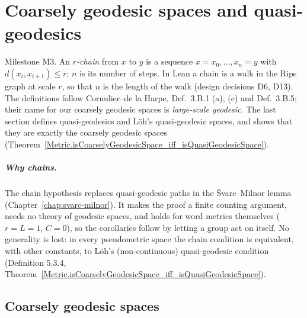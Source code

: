 \chapter{Coarsely geodesic spaces and quasi-geodesics}
\label{chap:coarsely-geodesic}

Milestone M3. An \emph{$r$-chain} from $x$ to $y$ is a sequence $x = x_0, \dots, x_n = y$ with
$d(x_i, x_{i+1}) \le r$; $n$ is its number of steps. In Lean a chain is a walk in the Rips graph at
scale $r$, so that $n$ is the length of the walk (design decisions D6, D13). The definitions follow
Cornulier--de la Harpe, Def.~3.B.1 (a), (c) and Def.~3.B.5; their name for our coarsely geodesic
spaces is \emph{large-scale geodesic}. The last section defines quasi-geodesics and L\"oh's quasi-geodesic
spaces, and shows that they are exactly the coarsely geodesic spaces
(Theorem~\ref{Metric.isCoarselyGeodesicSpace_iff_isQuasiGeodesicSpace}).

\paragraph{Why chains.} The chain hypothesis replaces quasi-geodesic paths in the \v{S}varc--Milnor
lemma (Chapter~\ref{chap:svarc-milnor}). It makes the proof a finite counting argument, needs no
theory of geodesic spaces, and holds for word metrics themselves ($r = L = 1$, $C = 0$), so the
corollaries follow by letting a group act on itself. No generality is lost: in every pseudometric
space the chain condition is equivalent, with other constants, to L\"oh's (non-continuous)
quasi-geodesic condition (Definition 5.3.4,
Theorem~\ref{Metric.isCoarselyGeodesicSpace_iff_isQuasiGeodesicSpace}).

\section*{Coarsely geodesic spaces}








